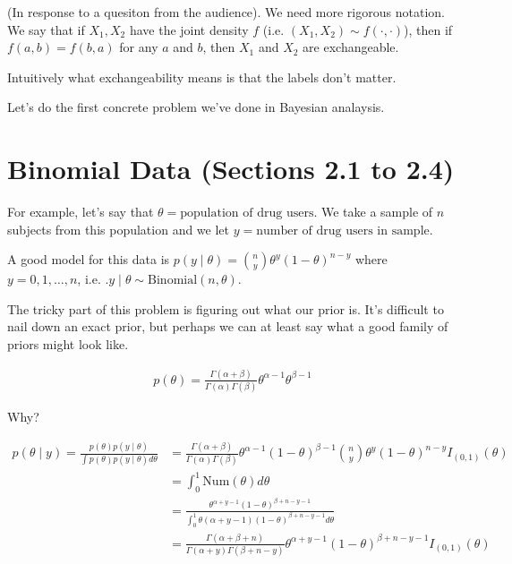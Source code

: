 \documentclass[a4paper]{article}
\begin{document}
(In response to a quesiton from the audience). We need more rigorous notation. We say that if $X_1, X_2$ have the joint density $f$ (i.e. $(X_1, X_2) \sim f(\cdot, \cdot)$), then if $f(a, b) = f(b, a)$ for any $a$ and $b$, then $X_1$ and $X_2$ are exchangeable.

Intuitively what exchangeability means is that the labels don't matter.

Let's do the first concrete problem we've done in Bayesian analaysis.

\section{Binomial Data (Sections 2.1 to 2.4)}

For example, let's say that $\theta = \text{population of drug users}$. We take a sample of $n$ subjects from this population and we let $y = \text{number of drug users in sample}$.

A good model for this data is $p(y \mid \theta) = \binom{n}{y} \theta ^y (1 - \theta) ^{n - y}$ where $y = 0, 1, \ldots, n$, i.e. .$y \mid \theta \sim \text{Binomial}(n, \theta)$.

The tricky part of this problem is figuring out what our prior is. It's difficult to nail down an exact prior, but perhaps we can at least say what a good family of priors might look like.

\begin{align}
	p(\theta) = \frac{\Gamma (\alpha + \beta)}{\Gamma(\alpha) \Gamma(\beta)}\theta ^{\alpha - 1} \theta ^{\beta - 1}
\end{align}

Why?

\begin{align}
	p(\theta \mid y) = \frac{p(\theta) p(y \mid \theta)}{\int p(\theta) p(y \mid \theta) d\theta} &= \frac{\Gamma(\alpha + \beta)}{\Gamma(\alpha)\Gamma(\beta)} \theta ^{\alpha - 1} (1 - \theta)^{\beta - 1} \binom{n}{y} \theta ^y (1 - \theta)^{n - y} I_{(0, 1)} (\theta) \\
	&= \int _0 ^1 \text{Num}(\theta) d\theta \\
	&= \frac{\theta ^{\alpha + y - 1} (1 - \theta) ^{\beta + n - y - 1}}{\int _0 ^1 \theta (\alpha + y - 1) (1 - \theta) ^{\beta + n - y - 1} d\theta} \\
	&= \frac{\Gamma(\alpha + \beta + n)}{\Gamma (\alpha + y)\Gamma(\beta + n -y)} \theta^{\alpha + y - 1} (1 - \theta) ^{\beta + n - y - 1} I _{(0, 1)} (\theta)
\end{align}
\end{document}
